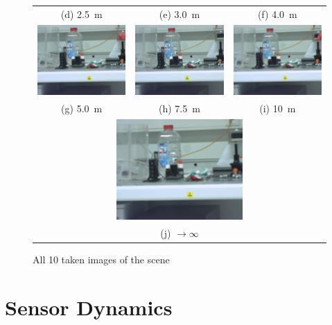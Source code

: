 \documentclass[
a4paper,     %
11pt         %
]{scrartcl}  %
\begin{document}
\begin{figure}
\begin{tabular}{ccc}
(d) \SI{2.5}{m}& (e) \SI{3.0}{m} & (f) \SI{4.0}{m}\\[6pt]
 \includegraphics[width=48mm]{./Bildg_Messtechnik_Lab/Autofokus/images/image_05.png} & \includegraphics[width=48mm]{./Bildg_Messtechnik_Lab/Autofokus/images/image_07_5.png} & \includegraphics[width=48mm]{./Bildg_Messtechnik_Lab/Autofokus/images/image_10.png}\\
(g) \SI{5.0}{m} & (h) \SI{7.5}{m} & (i) \SI{10}{m}\\[6pt]
 \multicolumn{3}{c}{\includegraphics[width=48mm]{./Bildg_Messtechnik_Lab/Autofokus/images/image_inf.png}} \\[6pt]
 \multicolumn{3}{c}{(j) $\rightarrow\infty$}
\end{tabular}
\caption{All 10 taken images of the scene}
\label{fig:alltakenimages}
\end{figure}

\pagebreak

\section{Sensor Dynamics}
\end{document}
